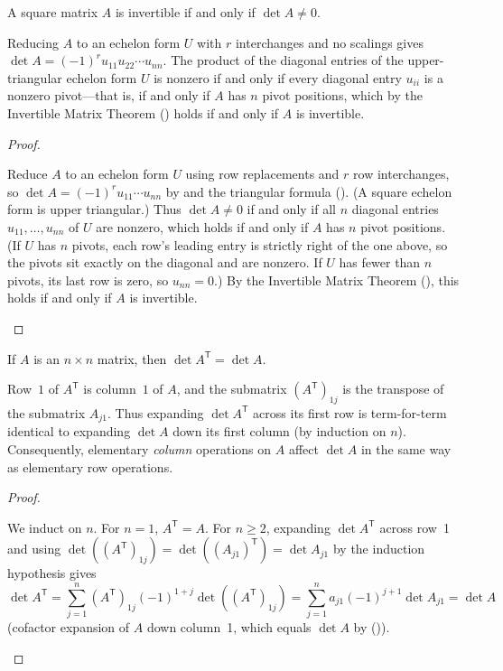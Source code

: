 \documentclass[10pt]{scrartcl}
\begin{document}
\begin{theorem*}
  A square matrix $A$ is invertible if and only if $\det A\ne 0$.
\end{theorem*}
\begin{ideabox}
  Reducing $A$ to an echelon form $U$ with $r$ interchanges and no scalings gives $\det A=(-1)^r u_{11}u_{22}\cdots u_{nn}$. The product of the diagonal entries of the upper-triangular echelon form $U$ is nonzero if and only if every diagonal entry $u_{ii}$ is a nonzero pivot---that is, if and only if $A$ has $n$ pivot positions, which by the Invertible Matrix Theorem () holds if and only if $A$ is invertible.
\end{ideabox}
\begin{proof}
  \begin{steps}
    \ii Reduce $A$ to an echelon form $U$ using row replacements and $r$ row interchanges, so $\det A=(-1)^r u_{11}\cdots u_{nn}$ by  and the triangular formula (). (A square echelon form is upper triangular.)
    \ii Thus $\det A\ne 0$ if and only if all $n$ diagonal entries $u_{11},\dots,u_{nn}$ of $U$ are nonzero, which holds if and only if $A$ has $n$ pivot positions. (If $U$ has $n$ pivots, each row's leading entry is strictly right of the one above, so the pivots sit exactly on the diagonal and are nonzero. If $U$ has fewer than $n$ pivots, its last row is zero, so $u_{nn}=0$.) By the Invertible Matrix Theorem (), this holds if and only if $A$ is invertible.
  \end{steps}
\end{proof}

\begin{theorem*}
  If $A$ is an $n\times n$ matrix, then $\det A^{\mathsf T} = \det A$.
\end{theorem*}
\begin{ideabox}
  Row~$1$ of $A^{\mathsf T}$ is column~$1$ of $A$, and the submatrix $(A^{\mathsf T})_{1j}$ is the transpose of the submatrix $A_{j1}$. Thus expanding $\det A^{\mathsf T}$ across its first row is term-for-term identical to expanding $\det A$ down its first column (by induction on $n$). Consequently, elementary \emph{column} operations on $A$ affect $\det A$ in the same way as elementary row operations.
\end{ideabox}
\begin{proof}
  \begin{steps}
    \ii We induct on $n$. For $n=1$, $A^{\mathsf T}=A$. For $n\ge 2$, expanding $\det A^{\mathsf T}$ across row~1 and using $\det((A^{\mathsf T})_{1j})=\det((A_{j1})^{\mathsf T})=\det A_{j1}$ by the induction hypothesis gives
    \[
      \det A^{\mathsf T}=\sum_{j=1}^n (A^{\mathsf T})_{1j}(-1)^{1+j}\det((A^{\mathsf T})_{1j})=\sum_{j=1}^n a_{j1}(-1)^{j+1}\det A_{j1}=\det A
    \]
    (cofactor expansion of $A$ down column~1, which equals $\det A$ by ()).
  \end{steps}
\end{proof}
\end{document}
